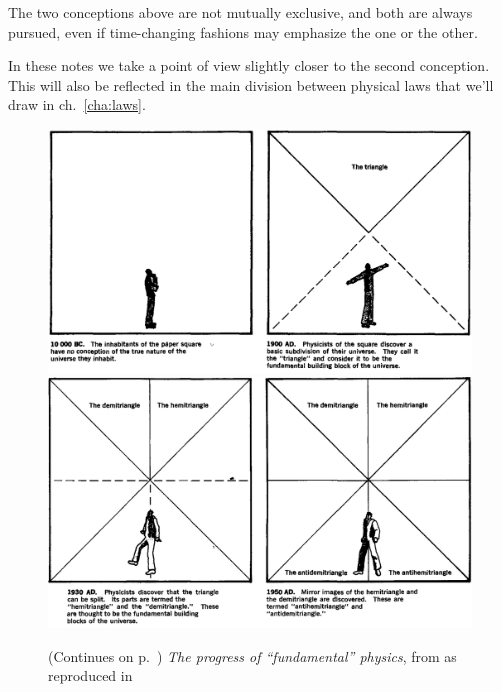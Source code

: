 \documentclass[a4paper,12pt,%
onecolumn,oneside,titlepage,%
british%
]{memoir}
\renewcommand*{\|}[1][]{\nonscript\:#1\vert\nonscript\:\mathopen{}}
\newcommand*{\chap}{ch.}%
\begin{document}
The two conceptions above are not mutually exclusive, and both are always pursued, even if time-changing fashions may emphasize the one or the other.

In these notes we take a point of view slightly closer to the second conception. This will also be reflected in the main division between physical laws that we'll draw in \chap~\ref{cha:laws}.


\begin{figure}[p]
  \centering
  \includegraphics[width=1.2\textwidth]{chew1.png}
  \\[1em]  \includegraphics[width=1.2\textwidth]{chew2.png}
  \caption{(Continues on p.~\pageref{fig:chew2}) \emph{The progress of \enquote{fundamental} physics}, from \cites{chew1970} as reproduced in \cites{truesdell1984_r1987}}
  \label{fig:chew1}
\end{figure}
\end{document}
